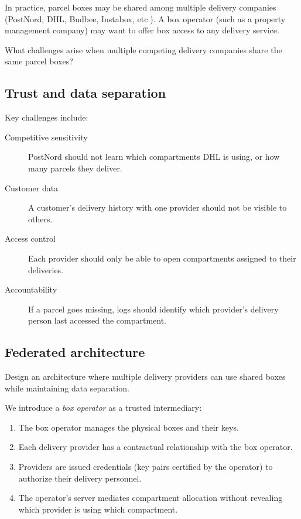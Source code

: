 
In practice, parcel boxes may be shared among multiple delivery companies 
(PostNord, DHL, Budbee, Instabox, etc.).
A box operator (such as a property management company) may want to offer box 
access to any delivery service.

\begin{exercise}
  What challenges arise when multiple competing delivery companies share the 
  same parcel boxes?
\end{exercise}

\subsection{Trust and data separation}

Key challenges include:
\begin{description}
  \item[Competitive sensitivity] PostNord should not learn which compartments 
    DHL is using, or how many parcels they deliver.
  \item[Customer data] A customer's delivery history with one provider should 
    not be visible to others.
  \item[Access control] Each provider should only be able to open compartments 
    assigned to their deliveries.
  \item[Accountability] If a parcel goes missing, logs should identify which 
    provider's delivery person last accessed the compartment.
\end{description}

\subsection{Federated architecture}

\begin{exercise}
  Design an architecture where multiple delivery providers can use shared boxes 
  while maintaining data separation.
\end{exercise}

We introduce a \emph{box operator} as a trusted intermediary:
\begin{enumerate}
  \item The box operator manages the physical boxes and their keys.
  \item Each delivery provider has a contractual relationship with the box 
    operator.
  \item Providers are issued credentials (key pairs certified by the operator) 
    to authorize their delivery personnel.
  \item The operator's server mediates compartment allocation without revealing 
    which provider is using which compartment.
\end{enumerate}

